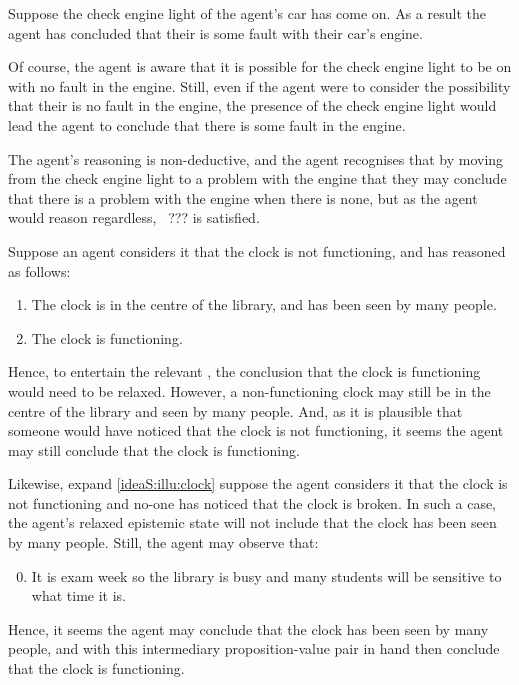     \begin{note}
  \begin{illustration}
    Suppose the check engine light of the agent's car has come on.
    As a result the agent has concluded that their is some fault with their car's engine.

    Of course, the agent is aware that it is possible for the check engine light to be on with no fault in the engine.
    Still, even if the agent were to consider the possibility that their is no fault in the engine, the presence of the check engine light would lead the agent to conclude that there is some fault in the engine.
  \end{illustration}

  The agent's reasoning is non-deductive, and the agent recognises that by moving from the check engine light to a problem with the engine that they may conclude that there is a problem with the engine when there is none, but as the agent would reason regardless,~{\color{red} ???} is satisfied.
\end{note}

\begin{note}
  \begin{illustration}
    \label{ideaS:illu:clock}
    Suppose an agent considers it \epPAd{} that the clock is not functioning, and has reasoned as follows:
    \begin{enumerate}
    \item The clock is in the centre of the library, and has been seen by many people.
    \item The clock is functioning.
    \end{enumerate}
    \vspace{-\baselineskip}
  \end{illustration}

  Hence, to entertain the relevant , the conclusion that the clock is functioning would need to be relaxed.
  However, a non-functioning clock may still be in the centre of the library and seen by many people.
  And, as it is plausible that someone would have noticed that the clock is not functioning, it seems the agent may still conclude that the clock is functioning.

  Likewise, expand \autoref{ideaS:illu:clock} suppose the agent considers it \epPAd{} that the clock is not functioning and no-one has noticed that the clock is broken.
  In such a case, the agent's relaxed epistemic state will not include that the clock has been seen by many people.
  Still, the agent may observe that:
  \begin{enumerate}
    \setcounter{enumi}{-1}
  \item It is exam week so the library is busy and many students will be sensitive to what time it is.
  \end{enumerate}
  Hence, it seems the agent may conclude that the clock has been seen by many people, and with this intermediary proposition-value pair in hand then conclude that the clock is functioning.
\end{note}

